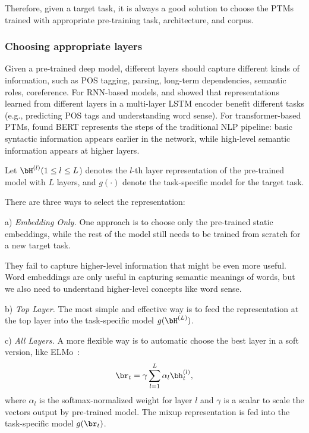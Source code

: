 \documentclass[fleqn]{SCYE-arxiv}
\begin{document}
\begin{multicols}{2}
Therefore, given a target task, it is always a good solution to choose the PTMs trained with appropriate pre-training task, architecture, and corpus.


\subsubsection{Choosing appropriate layers}

Given a pre-trained deep model, different layers should capture different kinds of information, such as POS tagging, parsing, long-term dependencies, semantic roles, coreference. For RNN-based models, \citet{belinkov-etal-2017-neural} and \citet{melamud-etal-2016-context2vec} showed that representations learned from different layers in a multi-layer LSTM encoder benefit different tasks (e.g., predicting POS tags and understanding word sense).
For transformer-based PTMs, \citet{DBLP:conf/acl/TenneyDP19} found BERT represents the steps of the traditional NLP pipeline: basic syntactic information appears
earlier in the network, while high-level semantic
information appears at higher layers.


Let $\bH^{(l)}( 1\leq l\leq L$) denotes the $l$-th layer representation of the pre-trained model with $L$ layers, and $g(\cdot)$ denote the task-specific model for the target task.

There are three ways to select the representation:

a) \textit{Embedding Only.}
One approach is to choose only the pre-trained static embeddings, while the rest of the model still needs to be trained from scratch for a new target task.

 They fail to capture higher-level information that might be even more useful. Word embeddings are only useful in capturing semantic meanings of words, but we also need to understand higher-level concepts like word sense.

b) \textit{Top Layer.} The most simple and effective way is to feed the representation at the top layer into the task-specific model $g(\bH^{(L)})$.

c) \textit{All Layers.} A more flexible way is to automatic choose the best layer in a soft version, like ELMo~\cite{peters2018elmo}:
\begin{align}
\br_t = \gamma \sum_{l=1}^{L} \alpha_l \bh_t^{(l)},
\end{align}
where $\alpha_l$ is the softmax-normalized weight for layer $l$ and $\gamma$ is a scalar to scale the vectors output by pre-trained model.
The mixup representation is fed into the task-specific model $g(\br_t)$.




\end{multicols}
\end{document}

